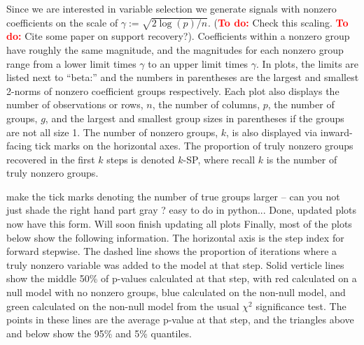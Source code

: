 \documentclass{imsart}
\newcommand{\todo}{\textcolor{red}{\textbf{To do: }}}
\newcommand{\jonathan}[1]{{\color{blue}  #1}}
\newcommand{\josh}[1]{{\color{green} #1}}
\begin{document}
Since we are interested in variable selection we generate signals with
nonzero coefficients on the scale of $\gamma := \sqrt{2 \log(p)/n}$.
(\todo Check this scaling. \todo Cite some paper on support recovery?).
Coefficients within a
nonzero group have roughly the same magnitude, and the magnitudes for
each nonzero group range from a lower limit times $\gamma$ to an upper
limit times $\gamma$. In plots, the limits are listed next to ``beta:''
and the numbers in parentheses are the largest and smallest 2-norms of
nonzero coefficient groups respectively. Each plot also displays the
number of observations or rows, $n$, the number of columns, $p$, the
number of groups, $g$, and the largest and smallest group sizes in
parentheses if the groups are not all size 1. The number of nonzero
groups, $k$, is also displayed via inward-facing tick marks on the
horizontal axes. The proportion of truly
nonzero groups recovered in the first $k$ steps is denoted $k$-SP,
where recall $k$ is the number of truly nonzero groups. 

\jonathan{make the tick marks denoting the number of true groups larger -- can you not just shade the right hand part gray ? easy to do in python...}
\josh{Done, updated plots now have this form. Will soon finish updating all plots}
Finally, most of the plots below show the following information. The
horizontal axis is the step index for forward stepwise. The dashed
line shows the proportion of iterations where a truly nonzero variable
was added to the model at that step. Solid verticle lines show the
middle 50\% of p-values calculated at that step, with red calculated
on a null model with no nonzero groups, blue calculated on the non-null
model, and green calculated on the non-null model from the usual
$\chi^2$ significance test.
The points in these lines are the average p-value at that step, and
the triangles above and below show the 95\% and 5\% quantiles.
\end{document}

